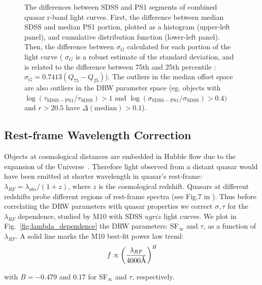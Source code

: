 \documentclass[twocolumn]{aastex62}
\let\oldAA\AA
\renewcommand{\AA}{\text{\normalfont\oldAA}}
\begin{document}
\begin{figure} %
\caption{The differences between SDSS and PS1 segments of combined quasar r-band light curves. First, the difference between median SDSS and median PS1 portion, plotted as a histogram (upper-left panel), and cumulative distribution function (lower-left panel). Then, the difference between $\sigma_{G}$ calculated for each portion of the light curve (
$\sigma_{G}$ is a robust estimate of the standard deviation, and is related to the difference between 75th and 25th percentile : $\sigma_{G} = 0.7413(Q_{75} - Q_{25})$). The outliers in the median offset space are also outliers in the DRW parameter space (eg. objects with $\log{(\tau_{\mathrm{SDSS-PS1}} /  \tau_{\mathrm{SDSS}})} > 1$   and   $\log{(\sigma_{\mathrm{SDSS-PS1}} / \sigma_{\mathrm{SDSS}})}   > 0.4  )$  and $r > 20.5$  have    $\Delta(\mathrm{median}) > 0.1$).}
\label{fig:median_offsets}
\end{figure}




\subsection{Rest-frame Wavelength Correction}

Objects at cosmological distances are embedded in Hubble flow due to the expansion of the Universe~\citep{riess2019}. Therefore light observed from a distant quasar would have been emitted at shorter wavelength in quasar's rest-frame: $\lambda_{RF} = \lambda_{obs} / (1+z)$, where $z$ is the cosmological redshift. Quasars at different redshifts probe different regions of rest-frame spectra (see Fig.7 in \citealt{shen2018}). Thus before correlating the DRW parameters with quasar properties we correct $\sigma, \tau$ for the $\lambda_{RF}$ dependence, studied by M10 with SDSS $ugriz$ light curves. We plot in Fig.~\ref{fig:lambda_dependence} the DRW parameters: SF$_{\infty}$ and $\tau$, as a function of $\lambda_{RF}$. A solid line marks the M10 best-fit power law trend:
\begin{equation}
\label{eq:lambda}
f \propto \left( \frac{\lambda_{RF}}{4000 \mbox{\AA}} \right)^{B}
\end{equation}

with  $B=-0.479$ and $0.17$ for SF$_{\infty}$ and $\tau$, respectively.
\end{document}

